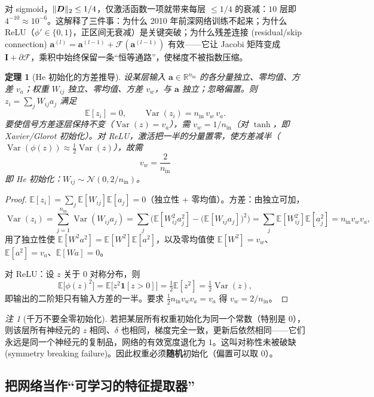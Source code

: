 \documentclass[UTF8,a4paper,11pt]{ctexart}
\theoremstyle{definition}
\theoremstyle{plain}
\newtheorem{theorem}[definition]{定理}
\theoremstyle{remark}
\newtheorem{remark}[definition]{注}
\DeclarePairedDelimiter{\norm}{\lVert}{\rVert}
\DeclareMathOperator{\Var}{Var}
\newcommand{\R}{\mathbb{R}}
\newcommand{\E}{\mathbb{E}}
\newcommand{\eng}[1]{\textup{(#1)}}
\begin{document}
对 sigmoid，$\norm{\bm{D}}_2\le1/4$，仅激活函数一项就带来每层 $\le1/4$ 的衰减：$10$ 层即 $4^{-10}\approx10^{-6}$。这解释了三件事：为什么 2010 年前深网络训练不起来；为什么 ReLU（$\phi'\in\{0,1\}$，正区间无衰减）是关键突破；为什么残差连接 \eng{residual/skip connection} $\bm{a}^{(l)}=\bm{a}^{(l-1)}+\mathcal{F}(\bm{a}^{(l-1)})$ 有效——它让 Jacobi 矩阵变成 $\bm{I}+\partial\mathcal{F}$，乘积中始终保留一条“恒等通路”，使梯度不被指数压缩。

\begin{theorem}[He 初始化的方差推导]\label{thm:he-init}
设某层输入 $\bm{a}\in\R^{n_{\mathrm{in}}}$ 的各分量独立、零均值、方差 $v_a$；权重 $W_{ij}$ 独立、零均值、方差 $v_w$，与 $\bm{a}$ 独立；忽略偏置。则 $z_i=\sum_jW_{ij}a_j$ 满足
\[
  \E[z_i]=0,\qquad \Var(z_i)=n_{\mathrm{in}}\,v_w\,v_a .
\]
要使信号方差逐层保持不变（$\Var(z)=v_a$），需 $v_w=1/n_{\mathrm{in}}$（对 $\tanh$，即 Xavier/Glorot 初始化）。对 ReLU，激活把一半的分量置零，使方差减半（$\Var(\phi(z))\approx\tfrac12\Var(z)$），故需
\[
  \boxed{\ v_w=\frac{2}{n_{\mathrm{in}}}\ }
\]
即 He 初始化：$W_{ij}\sim\mathcal{N}(0,2/n_{\mathrm{in}})$。
\end{theorem}

\begin{proof}
$\E[z_i]=\sum_j\E[W_{ij}]\E[a_j]=0$（独立性 + 零均值）。方差：由独立可加，
\[
  \Var(z_i)=\sum_{j=1}^{n_{\mathrm{in}}}\Var(W_{ij}a_j)
  =\sum_j\Big(\E[W_{ij}^2a_j^2]-\big(\E[W_{ij}a_j]\big)^2\Big)
  =\sum_j\E[W_{ij}^2]\E[a_j^2]=n_{\mathrm{in}}v_wv_a ,
\]
用了独立性使 $\E[W^2a^2]=\E[W^2]\E[a^2]$，以及零均值使 $\E[W^2]=v_w$、$\E[a^2]=v_a$、$\E[Wa]=0$。

对 ReLU：设 $z$ 关于 $0$ 对称分布，则
\[
  \E\big[\phi(z)^2\big]=\E\big[z^2\bm{1}[z>0]\big]=\tfrac12\E[z^2]=\tfrac12\Var(z),
\]
即输出的二阶矩只有输入方差的一半。要求 $\tfrac12 n_{\mathrm{in}}v_wv_a=v_a$ 得 $v_w=2/n_{\mathrm{in}}$。
\end{proof}

\begin{remark}[千万不要全零初始化]\label{rmk:zero-init}
若把某层所有权重初始化为同一个常数（特别是 $0$），则该层所有神经元的 $z$ 相同、$\delta$ 也相同，梯度完全一致，更新后依然相同——它们永远是同一个神经元的复制品，网络的有效宽度退化为 $1$。这叫对称性未被破缺 \eng{symmetry breaking failure}。因此权重必须\textbf{随机}初始化（偏置可以取 $0$）。
\end{remark}

\subsection{把网络当作“可学习的特征提取器”}
\end{document}
